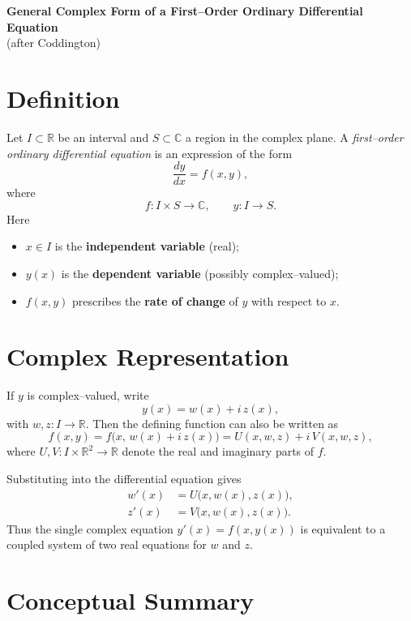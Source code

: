 \documentclass[12pt]{article}
\begin{document}
	
	\begin{center}
		\Large\textbf{General Complex Form of a First--Order Ordinary Differential Equation}\\[0.5em]
		\normalsize (after Coddington)
	\end{center}
	
	\section*{Definition}
	
	Let \( I \subset \mathbb{R} \) be an interval and \( S \subset \mathbb{C} \) a region in the complex plane.  
	A \emph{first--order ordinary differential equation} is an expression of the form
	\[
	\boxed{\frac{dy}{dx} = f(x,y)},
	\]
	where
	\[
	f : I \times S \longrightarrow \mathbb{C}, \qquad y : I \longrightarrow S.
	\]
	Here
	\begin{itemize}
		\item \(x \in I\) is the \textbf{independent variable} (real);
		\item \(y(x)\) is the \textbf{dependent variable} (possibly complex--valued);
		\item \(f(x,y)\) prescribes the \textbf{rate of change} of \(y\) with respect to \(x\).
	\end{itemize}
	
	\section*{Complex Representation}
	
	If \(y\) is complex--valued, write
	\[
	y(x) = w(x) + i\,z(x),
	\]
	with \(w,z : I \to \mathbb{R}\).
	Then the defining function can also be written as
	\[
	f(x,y) = f\big(x,\,w(x) + i\,z(x)\big)
	= U(x,w,z) + i\,V(x,w,z),
	\]
	where \(U,V : I \times \mathbb{R}^2 \to \mathbb{R}\) denote the real and imaginary parts of \(f\).
	
	Substituting into the differential equation gives
	\[
	\boxed{
		\begin{aligned}
			w'(x) &= U\big(x,w(x),z(x)\big),\\
			z'(x) &= V\big(x,w(x),z(x)\big).
		\end{aligned}
	}
	\]
	Thus the single complex equation \(y'(x)=f(x,y(x))\) is equivalent to a coupled system of two real equations for \(w\) and \(z\).
	
	\section*{Conceptual Summary}
	
\end{document}
